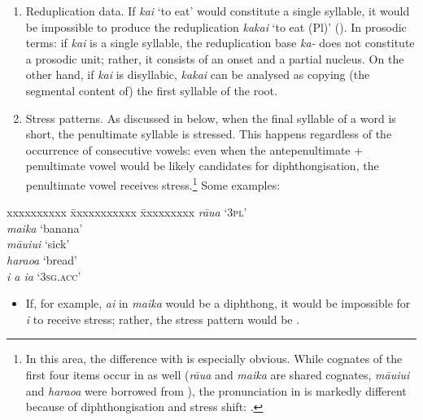 \begin{enumerate}
\item 
Reduplication data. If \textit{kai} ‘to eat’ would constitute a single syllable, it would be impossible to produce the reduplication \textit{kakai} ‘to eat (Pl)’ (). In prosodic terms: if \textit{kai} is a single syllable, the reduplication base \textit{ka-} does not constitute a prosodic unit; rather, it consists of an onset and a partial nucleus. On the other hand, if \textit{kai} is disyllabic, \textit{kakai} can be analysed as copying (the segmental content of) the first syllable of the root.

\item 
Stress patterns. As discussed in  below, when the final syllable of a word is short, the penultimate syllable is stressed. This happens regardless of the occurrence of consecutive vowels: even when the antepenultimate + penultimate vowel would be likely candidates for diphthongisation, the penultimate vowel receives stress.\footnote{\label{fn:40}In this area, the difference with  is especially obvious. While cognates of the first four items occur in  as well (\textit{r}\textit{āua} and \textit{maika} are shared cognates, \textit{māuiui} and \textit{haraoa} were borrowed from ), the pronunciation in  is markedly different because of diphthongisation and stress shift: .} Some examples:
\end{enumerate}
\ea
\begin{tabbing}
 xxxxxxxxxx \= xxxxxxxxxxx \= xxxxxxxxx \kill
 \textit{rāua} \>   \>  ‘\textsc{3pl}’\\
 \textit{maika} \>   \>  ‘banana’\\
 \textit{māuiui} \>   \>  ‘sick’\\
 \textit{haraoa} \>   \>  ‘bread’\\
 \textit{i a ia} \>   \>  ‘3\textsc{sg}.\textsc{acc}’
\end{tabbing}
\z
\begin{itemize} 
\item[]
If, for example, \textit{ai} in \textit{maika} would be a diphthong, it would be impossible for \textit{i} to receive stress; rather, the stress pattern would be \textstyleIPA{[ˈmaika]}.
\end{itemize} 

